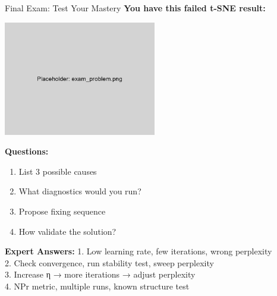 \documentclass[aspectratio=169]{beamer}
\begin{document}
\begin{frame}{Final Exam: Test Your Mastery}
\textbf{You have this failed t-SNE result:}
\begin{center}
\includegraphics[width=0.5\textwidth]{./Figures/exam_problem.png}
\end{center}

\textbf{Questions:}
\begin{enumerate}
\item List 3 possible causes
\item What diagnostics would you run?
\item Propose fixing sequence
\item How validate the solution?
\end{enumerate}

\pause
\textbf{Expert Answers:}
\small
1. Low learning rate, few iterations, wrong perplexity\\
2. Check convergence, run stability test, sweep perplexity\\
3. Increase η → more iterations → adjust perplexity\\
4. NPr metric, multiple runs, known structure test
\end{frame}
\end{document}
